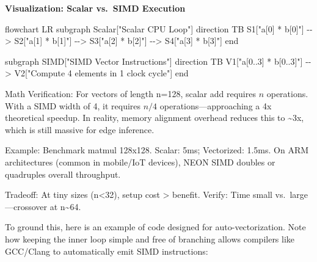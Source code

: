 \documentclass[
]{article}
\newenvironment{Shaded}{}{}
\newcommand{\NormalTok}[1]{#1}
\begin{document}
\textbf{Visualization: Scalar vs.~SIMD Execution}

\begin{Shaded}
\begin{Highlighting}[]
\NormalTok{flowchart LR}
\NormalTok{    subgraph Scalar["Scalar CPU Loop"]}
\NormalTok{        direction TB}
\NormalTok{        S1["a[0] * b[0]"] {-}{-}\textgreater{} S2["a[1] * b[1]"] {-}{-}\textgreater{} S3["a[2] * b[2]"] {-}{-}\textgreater{} S4["a[3] * b[3]"]}
\NormalTok{    end}
    
\NormalTok{    subgraph SIMD["SIMD Vector Instructions"]}
\NormalTok{        direction TB}
\NormalTok{        V1["a[0..3] * b[0..3]"] {-}{-}\textgreater{} V2["Compute 4 elements in 1 clock cycle"]}
\NormalTok{    end}
\end{Highlighting}
\end{Shaded}

Math Verification: For vectors of length n=128, scalar add requires
\(n\) operations. With a SIMD width of 4, it requires \(n/4\)
operations---approaching a 4x theoretical speedup. In reality, memory
alignment overhead reduces this to \textasciitilde3x, which is still
massive for edge inference.

Example: Benchmark matmul 128x128. Scalar: 5ms; Vectorized: 1.5ms. On
ARM architectures (common in mobile/IoT devices), NEON SIMD doubles or
quadruples overall throughput.

Tradeoff: At tiny sizes (n\textless32), setup cost \textgreater{}
benefit. Verify: Time small vs.~large---crossover at n\textasciitilde64.

To ground this, here is an example of code designed for
auto-vectorization. Note how keeping the inner loop simple and free of
branching allows compilers like GCC/Clang to automatically emit SIMD
instructions:
\end{document}
